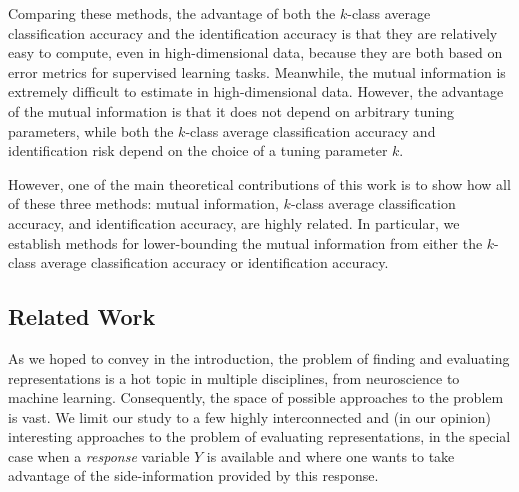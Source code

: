Comparing these methods, the advantage of both the $k$-class average
classification accuracy and the identification accuracy is that they
are relatively easy to compute, even in high-dimensional data, because
they are both based on error metrics for supervised learning tasks.
Meanwhile, the mutual information is extremely difficult to estimate
in high-dimensional data.  However, the advantage of the mutual
information is that it does not depend on arbitrary tuning parameters,
while both the $k$-class average classification accuracy and
identification risk depend on the choice of a tuning parameter $k$.

However, one of the main theoretical contributions of this work is to
show how all of these three methods: mutual information, $k$-class
average classification accuracy, and identification accuracy, are
highly related.  In particular, we establish methods for
lower-bounding the mutual information from either the $k$-class
average classification accuracy or identification accuracy.

\subsection{Related Work}\label{sec:related_work}

As we hoped to convey in the introduction, the problem of finding and
evaluating representations is a hot topic in multiple disciplines,
from neuroscience to machine learning.  Consequently, the space of
possible approaches to the problem is vast.  We limit our study to a
few highly interconnected and (in our opinion) interesting approaches
to the problem of evaluating representations, in the special case when
a \emph{response} variable $Y$ is available and where one wants to
take advantage of the side-information provided by this response.

